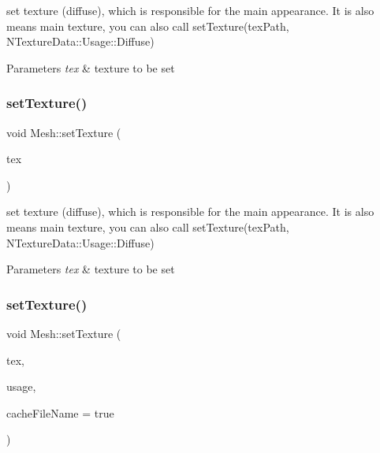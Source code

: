 set texture (diffuse), which is responsible for the main appearance. It is also means main texture, you can also call set\+Texture(tex\+Path, N\+Texture\+Data\+::\+Usage\+::\+Diffuse) 
\begin{DoxyParams}{Parameters}
{\em tex} & texture to be set \\
\hline
\end{DoxyParams}
\mbox{\label{classMesh_aa3492c9c06f12e024e2b7e1ec6258e0a}} 
\subsubsection{\texorpdfstring{set\+Texture()}{setTexture()}\hspace{0.1cm}{\footnotesize\ttfamily [4/8]}}
{\footnotesize\ttfamily void Mesh\+::set\+Texture (\begin{DoxyParamCaption}\item[{\hyperlink{classTexture2D}{Texture2D} $\ast$}]{tex }\end{DoxyParamCaption})}

set texture (diffuse), which is responsible for the main appearance. It is also means main texture, you can also call set\+Texture(tex\+Path, N\+Texture\+Data\+::\+Usage\+::\+Diffuse) 
\begin{DoxyParams}{Parameters}
{\em tex} & texture to be set \\
\hline
\end{DoxyParams}
\mbox{\label{classMesh_ae39c726ae3c302a5f6bcf8cb31ee7897}} 
\subsubsection{\texorpdfstring{set\+Texture()}{setTexture()}\hspace{0.1cm}{\footnotesize\ttfamily [5/8]}}
{\footnotesize\ttfamily void Mesh\+::set\+Texture (\begin{DoxyParamCaption}\item[{\hyperlink{classTexture2D}{Texture2D} $\ast$}]{tex,  }\item[{N\+Texture\+Data\+::\+Usage}]{usage,  }\item[{bool}]{cache\+File\+Name = {\ttfamily true} }\end{DoxyParamCaption})}

